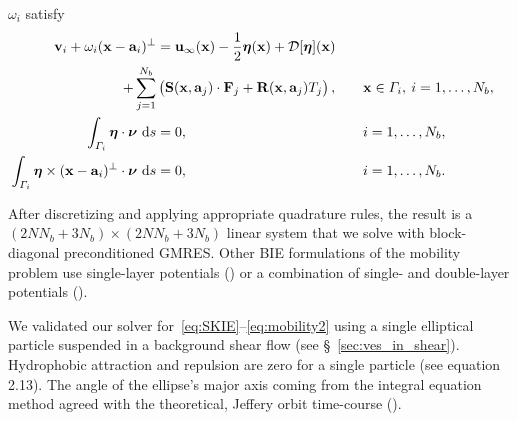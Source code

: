 \documentclass[lineno]{jfm}
\renewcommand{\aa}{\mathbf{a}}
\newcommand{\DD}{\mathcal{D}}
\newcommand{\eeta}{\boldsymbol{\eta}}
\newcommand{\FF}{\mathbf{F}}
\newcommand{\nnu}{\boldsymbol{\nu}}
\newcommand{\RR}{\mathbf{R}}
\renewcommand{\SS}{\mathbf{S}}
\newcommand{\xx}{\mathbf{x}}
\newcommand{\uu}{\mathbf{u}}
\renewcommand{\vv}{\mathbf{v}}
\begin{document}
$\omega_i$ satisfy
\begin{alignat}{3}
  \nonumber
  \vv_i + \omega_i (\xx - \aa_i)^\perp &= \uu_\infty(\xx)
    -\frac{1}{2} \eeta(\xx) + \DD[\eeta](\xx) \\
  \label{eq:SKIE}
    + \sum_{j=1}^{N_b} &
    \left(\SS(\xx,\aa_j) \cdot \FF_j + \RR(\xx,\aa_j) T_j\right),
    \quad &&\xx \in \Gamma_i,\: i=1,\ldots,N_b, \\
  \label{eq:mobility1}
  \int_{\Gamma_i} \eeta \cdot \nnu \, \dif s &= 0, 
  &&i = 1,\ldots,N_b, \\
  \label{eq:mobility2}
  \int_{\Gamma_i} \eeta\times(\xx-\aa_i)^\perp \cdot \nnu \, \dif s &= 0,
  &&i = 1,\ldots,N_b.
\end{alignat}

After discretizing and applying appropriate quadrature rules, the result
is a $(2NN_b + 3N_b) \times (2NN_b + 3N_b)$ linear system that we solve
with block-diagonal preconditioned GMRES. Other BIE formulations of the
mobility problem use single-layer potentials (\cite{cor-gre-rac-vee2017,
rac-gre2016}) or a combination of single- and double-layer potentials
(\cite{cor-vee2018}).

We validated our solver for~\eqref{eq:SKIE}--\eqref{eq:mobility2}
using a single elliptical particle suspended in a background shear flow
(see \S~\ref{sec:ves_in_shear}). Hydrophobic attraction and repulsion
are zero for a single particle (see \cite{Fu20} equation 2.13). The
angle of the ellipse's major axis coming from the integral equation
method agreed with the theoretical, Jeffery orbit time-course
(\cite{jef1922}). 
  
% 

\end{document}
